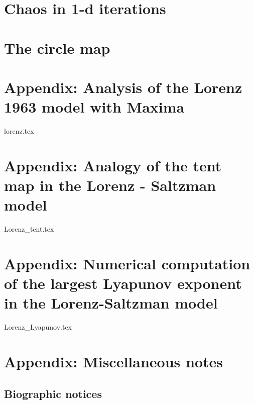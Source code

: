 \documentclass[fleqn,twoside]{mc}
\newcommand{\sectionbreak}{\clearpage\stepcounter{secshift}}
\newcounter{secshift}
\begin{document}
\section{Chaos in 1-d iterations}



\section{The circle map}


\appendix

\captionsetup{format=nocaption,aboveskip=0pt,belowskip=0pt}
\section{Appendix: Analysis of the Lorenz 1963 model with Maxima}
\label{appendix:maxima}
\small



{lorenz.tex}

\section{Appendix: Analogy of the tent map in the Lorenz - Saltzman model}

{Lorenz_tent.tex}
\label{appendix:tent}
\small

\section{Appendix: Numerical computation of the largest Lyapunov exponent in the Lorenz-Saltzman model}\label{appendix:lyapunov}

{Lorenz_Lyapunov.tex}

\section{Appendix: Miscellaneous notes}

\subsection{Biographic notices}
\renewcommand{\sectionbreak}{\stepcounter{secshift}}





\setlength\parskip{6pt}
\listofdfcounter
\listoftcounter

\printindex
%



\printindex
\end{document}
